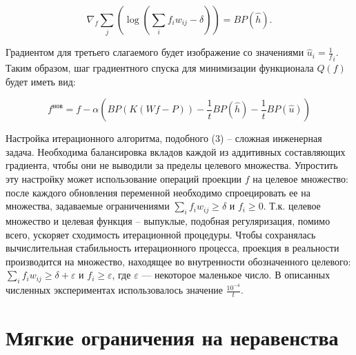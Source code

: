 $$
\nabla_f \sum_j {\left(
  \log{
    \left( \sum_i {f_i w_{ij}} - \delta \right)
  }
\right)} 
= BP(\hat{h}).
$$

Градиентом для третьего слагаемого будет изображение со значениями $\hat{u}_i = \frac 1 f_i$. Таким образом, шаг градиентного спуска для минимизации функционала $Q(f)$ будет иметь вид:

\begin{equation}
  \label{eq:barrier_method_gradstep}
  f^{\text{нов}} = f - \alpha \left(
    BP\left( K(Wf-P) \right) - 
    \frac 1 t BP(\hat{h}) - 
    \frac 1 t BP(\hat{u})
  \right)
\end{equation}

Настройка итерационного алгоритма, подобного (3) – сложная инженерная задача.
Необходима балансировка вкладов каждой из аддитивных составляющих градиента, чтобы они не выводили за пределы целевого множества. 
Упростить эту настройку может использование операций проекции $f$ на целевое множество: после каждого обновления переменной  необходимо спроецировать ее на множества, задаваемые ограничениями $\sum_i {f_i w_{ij}} \geq \delta$ и $f_i \geq 0$.
Т.к. целевое множество и целевая функция – выпуклые, подобная регуляризация, помимо всего, ускоряет сходимость итерационной процедуры.
Чтобы сохранялась вычислительная стабильность итерационного процесса, проекция в реальности производится на множество, находящее во внутренности обозначенного целевого: $\sum_i {f_i w_{ij}} \geq \delta + \varepsilon$ и $f_i \geq \varepsilon$, где $\varepsilon$ --- некоторое маленькое число.
В описанных численных экспериментах использовалось значение $\frac {10^{-4}}{t}$.



\section{Мягкие ограничения на неравенства} \label{sect_2_2}

